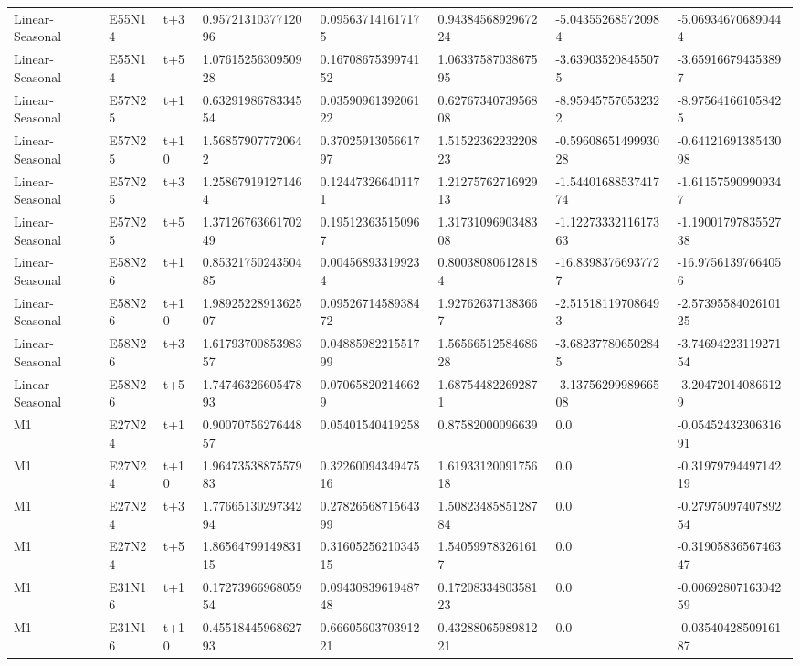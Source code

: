 \begin{landscape}
\begin{longtable}{llllllll}
Linear-Seasonal & E55N14 & t+3 & 0.9572131037712096 & 0.095637141617175 & 0.9438456892967224 & -5.043552685720984 & -5.069346706890444 \\
Linear-Seasonal & E55N14 & t+5 & 1.0761525630950928 & 0.1670867539974152 & 1.0633758703867595 & -3.639035208455075 & -3.659166794353897 \\
Linear-Seasonal & E57N25 & t+1 & 0.6329198678334554 & 0.0359096139206122 & 0.6276734073956808 & -8.959457570532322 & -8.975641661058425 \\
Linear-Seasonal & E57N25 & t+10 & 1.568579077720642 & 0.3702591305661797 & 1.5152236223220823 & -0.5960865149993028 & -0.6412169138543098 \\
Linear-Seasonal & E57N25 & t+3 & 1.258679191271464 & 0.124473266401171 & 1.2127576271692913 & -1.5440168853741774 & -1.611575909909347 \\
Linear-Seasonal & E57N25 & t+5 & 1.3712676366170249 & 0.195123635150967 & 1.3173109690348308 & -1.1227333211617363 & -1.1900179783552738 \\
Linear-Seasonal & E58N26 & t+1 & 0.8532175024350485 & 0.004568933199234 & 0.800380806128184 & -16.83983766937727 & -16.97561397664056 \\
Linear-Seasonal & E58N26 & t+10 & 1.9892522891362507 & 0.0952671458938472 & 1.927626371383667 & -2.515181197086493 & -2.5739558402610125 \\
Linear-Seasonal & E58N26 & t+3 & 1.6179370085398357 & 0.0488598221551799 & 1.5656651258468628 & -3.682377806502845 & -3.7469422311927154 \\
Linear-Seasonal & E58N26 & t+5 & 1.7474632660547893 & 0.070658202146629 & 1.687544822692871 & -3.1375629998966508 & -3.204720140866129 \\
M1 & E27N24 & t+1 & 0.9007075627644857 & 0.05401540419258 & 0.87582000096639 & 0.0 & -0.0545243230631691 \\
M1 & E27N24 & t+10 & 1.9647353887557983 & 0.3226009434947516 & 1.6193312009175618 & 0.0 & -0.3197979449714219 \\
M1 & E27N24 & t+3 & 1.7766513029734294 & 0.2782656871564399 & 1.5082348585128784 & 0.0 & -0.2797509740789254 \\
M1 & E27N24 & t+5 & 1.8656479914983115 & 0.3160525621034515 & 1.540599783261617 & 0.0 & -0.3190583656746347 \\
M1 & E31N16 & t+1 & 0.1727396696805954 & 0.0943083961948748 & 0.1720833480358123 & 0.0 & -0.0069280716304259 \\
M1 & E31N16 & t+10 & 0.4551844596862793 & 0.6660560370391221 & 0.4328806598981221 & 0.0 & -0.0354042850916187 \\

\end{longtable}
\end{landscape}
